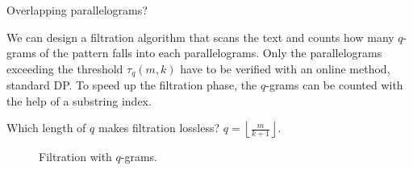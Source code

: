 Overlapping parallelograms?

We can design a filtration algorithm that scans the text and counts how many $q$-grams of the pattern falls into each parallelograms.
Only the parallelograms exceeding the threshold $\tau_q(m,k)$ have to be verified with an online method, \eg standard DP.
To speed up the filtration phase, the $q$-grams can be counted with the help of a substring index.

Which length of $q$ makes filtration lossless? $q=\left \lfloor \frac{m}{k+1} \right \rfloor$.

\begin{figure}[h]
\begin{center}
\caption{Filtration with $q$-grams.}
\label{fig:qgrams-ext}

\end{center}
\end{figure}
